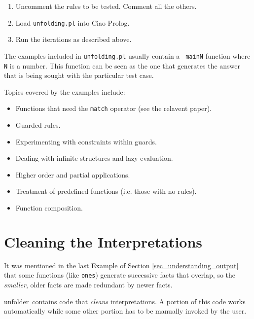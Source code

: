 \documentclass[11pt,a4paper,twoside,openright]{book}
\newcommand{\unfolder}{{\textsf{unfolder~}}}
\begin{document}
\begin{enumerate}
\item
Uncomment the rules to be tested. Comment all the others.

\item
Load {\tt unfolding.pl} into Ciao Prolog.

\item
Run the iterations as described above.
\end{enumerate}

\noindent
The examples included in {\tt unfolding.pl} usually contain a {\tt
  mainN} function where {\tt N} is a number. This function can be seen
as the one that generates the answer that is being sought with the
particular test case.

Topics covered by the examples include:

\begin{itemize}
\item
Functions that need the {\tt match} operator (see the relavent paper).

\item
Guarded rules.

\item
Experimenting with constraints within guards.

\item
Dealing with infinite structures and lazy evaluation.

\item
Higher order and partial applications.

\item
Treatment of predefined functions (i.e. those with no rules).

\item
Function composition.

\end{itemize}

\chapter{Cleaning the Interpretations}

It was mentioned in the last Example of Section
\ref{sec_understanding_output} that some functions (like {\tt ones}) generate
successive facts that overlap, so the {\em smaller}, older facts are
made redundant by newer facts.

\unfolder contains code that {\em cleans} interpretations. A portion
of this code works automatically while some other portion has to be
manually invoked by the user.
\end{document}
